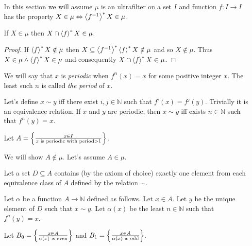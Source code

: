 In this section we will assume $\mu$ is an ultrafilter on a set $I$
and function $f:I\rightarrow I$ has the property $X\in\mu\Leftrightarrow\left\langle f^{-1}\right\rangle ^{\ast}X\in\mu$.
\begin{lem}
\label{lem:one-reloid-first}If $X\in\mu$ then $X\cap\left\langle f\right\rangle ^{\ast}X\in\mu$.\end{lem}
\begin{proof}
If $\left\langle f\right\rangle ^{\ast}X\notin\mu$ then $X\subseteq\left\langle f^{-1}\right\rangle ^{\ast}\left\langle f\right\rangle ^{\ast}X\notin\mu$
and so $X\notin\mu$. Thus $X\in\mu\land\left\langle f\right\rangle ^{\ast}X\in\mu$ and consequently
$X\cap\left\langle f\right\rangle ^{\ast}X\in\mu$.
\end{proof}
We will say that $x$ is \emph{periodic} when $f^{n}(x)=x$ for some
positive integer $x$. The least such $n$ is called \emph{the period}
of $x$.

Let's define $x\sim y$ iff there exist $i,j\in\mathbb{N}$ such that
$f^{i}(x)=f^{j}(y)$. Trivially it is an equivalence relation. If
$x$ and $y$ are periodic, then $x\sim y$ iff exists $n\in\mathbb{N}$
such that $f^{n}(y)=x$.

Let $A=\left\{ \frac{x\in I}{x\text{ is periodic with period}>1}\right\}$.

We will show $A\notin\mu$. Let's assume $A\in\mu$.

Let a set $D\subseteq A$ contains (by the axiom of choice) exactly
one element from each equivalence class of $A$ defined by the relation
$\sim$.

Let $\alpha$ be a function $A\rightarrow\mathbb{N}$ defined as follows.
Let $x\in A$. Let $y$ be the unique element of $D$ such that $x\sim y$.
Let $\alpha(x)$ be the least $n\in\mathbb{N}$ such that $f^{n}(y)=x$.

Let $B_{0}=\left\{ \frac{x\in A}{\alpha(x)\text{ is even}}\right\}$ and $B_{1}=\left\{ \frac{x\in A}{\alpha(x)\text{ is odd}}\right\}$.

